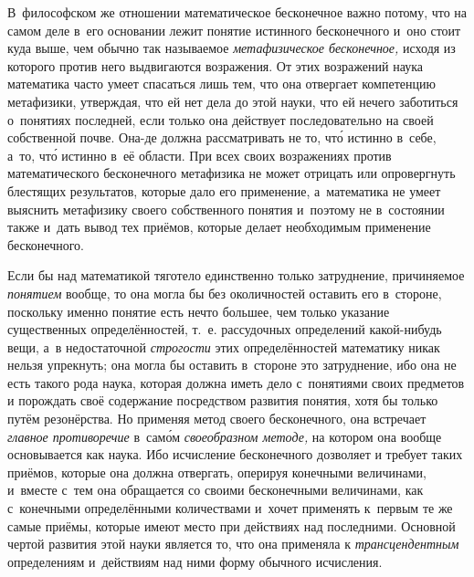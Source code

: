 В~философском же отношении математическое бесконечное важно потому, что на
самом деле в~его основании лежит понятие истинного бесконечного и~оно стоит
куда выше, чем обычно так называемое {\em метафизическое бесконечное,} исходя
из которого против него выдвигаются возражения. От этих возражений наука
математика часто умеет спасаться лишь тем, что она отвергает компетенцию
метафизики, утверждая, что ей нет дела до этой науки, что ей нечего
заботиться о~понятиях последней, если только она действует последовательно
на своей собственной почве. Она-де должна рассматривать не то, чт\'{о}
истинно в~себе, а~то, чт\'{о} истинно в~её области. При
всех своих возражениях против математического бесконечного метафизика не
может отрицать или опровергнуть блестящих результатов, которые дало его
применение, а~математика не умеет выяснить метафизику своего собственного
понятия и~поэтому не в~состоянии также и~дать вывод тех приёмов, которые
делает необходимым применение бесконечного.

Если бы над математикой тяготело единственно только затруднение, причиняемое
{\em понятием} вообще, то она могла бы без околичностей оставить его в~стороне,
поскольку именно понятие есть нечто большее, чем только указание существенных
определённостей, т.~е. рассудочных определений какой-нибудь вещи, а~в
недостаточной {\em строгости} этих определённостей математику никак нельзя
упрекнуть; она могла бы оставить в~стороне это затруднение, ибо она не есть
такого рода наука, которая должна иметь дело с~понятиями своих предметов и
порождать своё содержание посредством развития понятия, хотя бы только путём
резонёрства. Но применяя метод своего бесконечного, она
встречает {\em главное противоречие} в~сам\'{о}м {\em своеобразном методе,} на
котором она вообще основывается как наука. Ибо исчисление бесконечного дозволяет и
требует таких приёмов, которые она должна отвергать, оперируя конечными
величинами, и~вместе с~тем она обращается со своими бесконечными величинами,
как с~конечными определёнными количествами и~хочет применять к~первым те же
самые приёмы, которые имеют место при действиях над последними. Основной чертой
развития этой науки является то, что она применяла к {\em трансцендентным}
определениям и~действиям над ними форму обычного исчисления.

